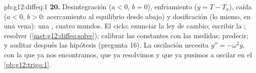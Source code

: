 \begin{solution}{pb:g12:diffeq:1}
\textbf{20.} Desintegración ($a < 0$, $b = 0$), enfriamiento
($y = T - T_a$), caída ($a < 0$, $b > 0$: acercamiento al equilibrio desde
abajo) y dosificación (lo mismo, en una vena): una , cuatro mundos.
El ciclo: enunciar la ley de cambio; escribir la ; resolver
(\cref{met:g12:diffeq:solve}); calibrar las constantes con las medidas;
predecir; y auditar después las hipótesis (pregunta 16). La oscilación
necesita $y'' = -\omega^2 y$, con la que ya nos encontramos, que ya
resolvimos y que ya pusimos a oscilar en el \cref{pb:g12:trigo:1}.
\end{solution}
